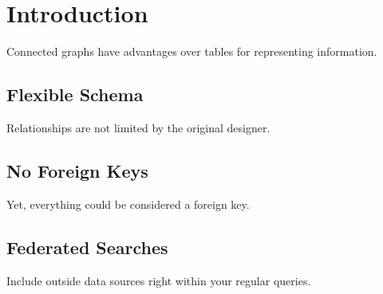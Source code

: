 \chapter{Introduction}

Connected graphs have advantages over tables for representing information.


\section{Flexible Schema}

Relationships are not limited by the original designer.


\section{No Foreign Keys}

Yet, everything could be considered a foreign key.


\section{Federated Searches}

Include outside data sources right within your regular queries.
